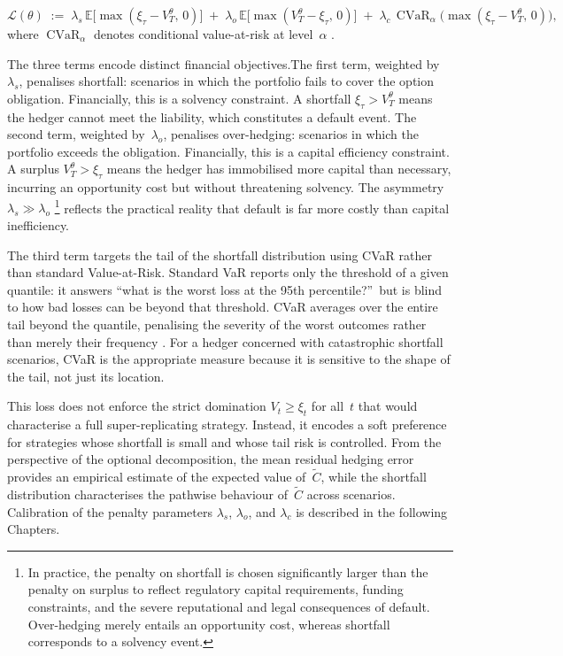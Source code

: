 \begin{equation}
\label{eq:loss}
\mathcal{L}(\theta)
\;:=\; \lambda_s \, \mathbb{E}\bigl[\max(\xi_\tau - V_T^\theta,\, 0)\bigr]
\;+\; \lambda_o \, \mathbb{E}\bigl[\max(V_T^\theta - \xi_\tau,\, 0)\bigr]
\;+\; \lambda_c \, \operatorname{CVaR}_\alpha\!\bigl(\max(\xi_\tau
      - V_T^\theta,\, 0)\bigr),
\end{equation}
where $\operatorname{CVaR}_\alpha$
denotes conditional value-at-risk at
level~$\alpha$ \citep{RockafellarUryasev2000}.  

The three terms encode distinct financial objectives.The first term, weighted by~$\lambda_s$, penalises shortfall: scenarios in which the portfolio fails to cover the option obligation.  Financially, this is a solvency constraint.  A shortfall $\xi_\tau > V_T^\theta$ means the hedger cannot meet the liability, which constitutes a default event. The second term, weighted by~$\lambda_o$, penalises over-hedging: scenarios in which the portfolio exceeds the obligation.  Financially,
this is a capital efficiency constraint.  A surplus $V_T^\theta > \xi_\tau$ means the hedger has immobilised more capital than necessary, incurring an opportunity cost but without threatening solvency. The asymmetry $\lambda_s \gg \lambda_o$ \footnote{In practice, the
penalty on shortfall is chosen significantly larger than the penalty
on surplus to reflect regulatory capital requirements, funding
constraints, and the severe reputational and legal consequences of
default.  Over-hedging merely entails an opportunity cost, whereas
shortfall corresponds to a solvency event.} reflects the practical reality that default is far more costly than capital inefficiency.

The third term targets the tail of the shortfall distribution using CVaR
rather than standard Value-at-Risk.  Standard VaR reports only the
threshold of a given quantile: it answers ``what is the worst loss at the
95th percentile?''\ but is blind to how bad losses can be beyond that
threshold.  CVaR averages over the entire tail beyond the quantile,
penalising the severity of the worst outcomes rather than merely their
frequency \citep{Artzner1999}.  For a hedger concerned with catastrophic
shortfall scenarios, CVaR is the appropriate measure because it is
sensitive to the shape of the tail, not just its location.

This loss does not enforce the strict domination $V_t \ge \xi_t$ for
all~$t$ that would characterise a full super-replicating strategy.
Instead, it encodes a soft preference for strategies whose shortfall is
small and whose tail risk is controlled.  From the perspective of the
optional decomposition, the mean residual hedging error provides an
empirical estimate of the expected value of~$\tilde{C}$, while the
shortfall distribution characterises the pathwise behaviour
of~$\tilde{C}$ across scenarios.  Calibration of the penalty parameters
$\lambda_s$, $\lambda_o$, and $\lambda_c$ is described in the following Chapters.


